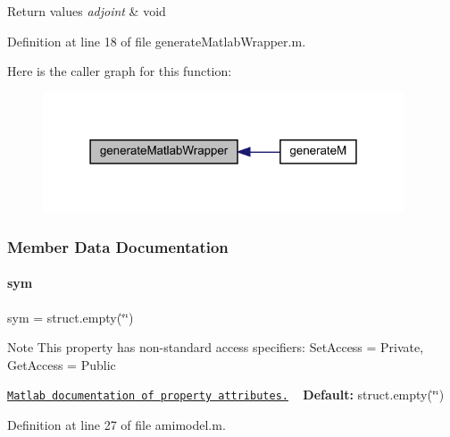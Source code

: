 \begin{DoxyRetVals}{Return values}
{\em adjoint} & void \\
\hline
\end{DoxyRetVals}


Definition at line 18 of file generate\+Matlab\+Wrapper.\+m.

Here is the caller graph for this function\+:
\nopagebreak
\begin{figure}[H]
\begin{center}
\leavevmode
\includegraphics[width=303pt]{classamimodel_aed66701025485d8fa04c20c5bae32a83_icgraph}
\end{center}
\end{figure}


\subsubsection{Member Data Documentation}
\mbox{\label{classamimodel_a3c48fff3d28406486a4f1b5e18da7ca6}} 
\paragraph{\texorpdfstring{sym}{sym}}
{\footnotesize\ttfamily sym = struct.\+empty(\char`\"{}\char`\"{})}

\begin{DoxyNote}{Note}
This property has non-\/standard access specifiers\+: {\ttfamily Set\+Access = Private, Get\+Access = Public} 

\href{http://www.mathworks.com/help/matlab/matlab_oop/property-attributes.html}{\tt Matlab documentation of property attributes.} ~\newline
{\bfseries Default\+:} struct.\+empty(\char`\"{}\char`\"{}) 
\end{DoxyNote}


Definition at line 27 of file amimodel.\+m.

\mbox{\label{classamimodel_a743fa290dbc0a67a3843d5ab0426e9b4}} 
